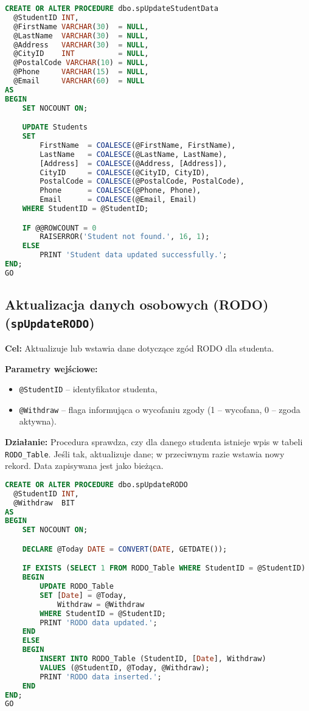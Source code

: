 \documentclass[12pt]{article}
\begin{document}
\begin{lstlisting}[language=SQL]
CREATE OR ALTER PROCEDURE dbo.spUpdateStudentData
  @StudentID INT,
  @FirstName VARCHAR(30)  = NULL,
  @LastName  VARCHAR(30)  = NULL,
  @Address   VARCHAR(30)  = NULL,
  @CityID    INT          = NULL,
  @PostalCode VARCHAR(10) = NULL,
  @Phone     VARCHAR(15)  = NULL,
  @Email     VARCHAR(60)  = NULL
AS
BEGIN
    SET NOCOUNT ON;

    UPDATE Students
    SET
        FirstName  = COALESCE(@FirstName, FirstName),
        LastName   = COALESCE(@LastName, LastName),
        [Address]  = COALESCE(@Address, [Address]),
        CityID     = COALESCE(@CityID, CityID),
        PostalCode = COALESCE(@PostalCode, PostalCode),
        Phone      = COALESCE(@Phone, Phone),
        Email      = COALESCE(@Email, Email)
    WHERE StudentID = @StudentID;

    IF @@ROWCOUNT = 0
        RAISERROR('Student not found.', 16, 1);
    ELSE
        PRINT 'Student data updated successfully.';
END;
GO
\end{lstlisting}

\newpage
\subsection{Aktualizacja danych osobowych (RODO) (\texttt{spUpdateRODO})}
\textbf{Cel:} Aktualizuje lub wstawia dane dotyczące zgód RODO dla studenta.

\textbf{Parametry wejściowe:}
\begin{itemize}
  \item \verb|@StudentID| – identyfikator studenta,
  \item \verb|@Withdraw| – flaga informująca o wycofaniu zgody (1 – wycofana, 0 – zgoda aktywna).
\end{itemize}

\textbf{Działanie:} Procedura sprawdza, czy dla danego studenta istnieje wpis w tabeli \verb|RODO_Table|. Jeśli tak, aktualizuje dane; w przeciwnym razie wstawia nowy rekord. Data zapisywana jest jako bieżąca.

\begin{lstlisting}[language=SQL]
CREATE OR ALTER PROCEDURE dbo.spUpdateRODO
  @StudentID INT,
  @Withdraw  BIT
AS
BEGIN
    SET NOCOUNT ON;

    DECLARE @Today DATE = CONVERT(DATE, GETDATE());

    IF EXISTS (SELECT 1 FROM RODO_Table WHERE StudentID = @StudentID)
    BEGIN
        UPDATE RODO_Table
        SET [Date] = @Today,
            Withdraw = @Withdraw
        WHERE StudentID = @StudentID;
        PRINT 'RODO data updated.';
    END
    ELSE
    BEGIN
        INSERT INTO RODO_Table (StudentID, [Date], Withdraw)
        VALUES (@StudentID, @Today, @Withdraw);
        PRINT 'RODO data inserted.';
    END
END;
GO
\end{lstlisting}
\end{document}
